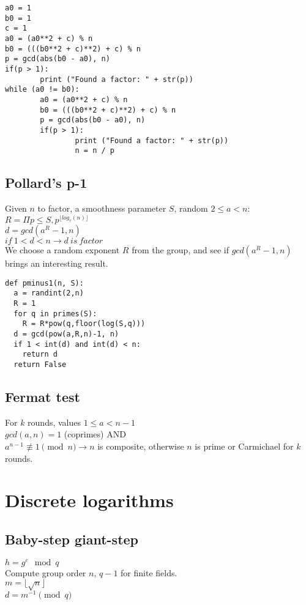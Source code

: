 \documentclass{article}
\begin{document}
\begin{verbatim}
a0 = 1
b0 = 1
c = 1
a0 = (a0**2 + c) % n
b0 = (((b0**2 + c)**2) + c) % n
p = gcd(abs(b0 - a0), n)
if(p > 1):
        print ("Found a factor: " + str(p))
while (a0 != b0):
        a0 = (a0**2 + c) % n
        b0 = (((b0**2 + c)**2) + c) % n
        p = gcd(abs(b0 - a0), n)
        if(p > 1):
                print ("Found a factor: " + str(p))
                n = n / p
\end{verbatim}

\subsection{Pollard's p-1}
Given $n$ to factor, a smoothness parameter $S$, random $2 \leq a < n$: \\
$R = \Pi p \leq S, p^{\lfloor log_r(n) \rfloor}$ \\
$d = gcd(a^R-1, n)$ \\
$if~1 < d < n \rightarrow d~is~factor$ \\

We choose a random exponent $R$ from the group, and see if $gcd(a^R -1, n)$
brings an interesting result.

\begin{verbatim}
def pminus1(n, S):
  a = randint(2,n)
  R = 1
  for q in primes(S):
    R = R*pow(q,floor(log(S,q)))
  d = gcd(pow(a,R,n)-1, n)
  if 1 < int(d) and int(d) < n:
    return d
  return False
\end{verbatim}

\subsection{Fermat test}
For $k$ rounds, values $1 \leq a < n-1$ \\
$gcd(a,n) = 1$ (coprimes) AND \\
$a^{n-1} \not\equiv 1 \pmod n \rightarrow n$ is composite,
otherwise $n$ is prime or Carmichael for $k$ rounds. \\

\section{Discrete logarithms}
\subsection{Baby-step giant-step}
$h = g^e \mod q$ \\
Compute group order $n$, $q-1$ for finite fields. \\
$m = \lfloor \sqrt{n} \rfloor$\\
$d = m^{-1} \pmod{q}$\\
\end{document}
